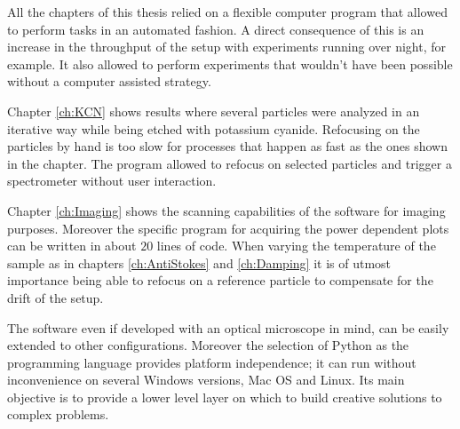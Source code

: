 All the chapters of this thesis relied on a flexible computer program that
allowed to perform tasks in an automated fashion. A direct consequence of this
is an increase in the throughput of the setup with experiments running over
night, for example. It also allowed to perform experiments that wouldn't have
been possible without a computer assisted strategy. 

Chapter \ref{ch:KCN} shows results where several particles were analyzed in an
iterative way while being etched with potassium cyanide. Refocusing on the
particles by hand is too slow for processes that happen as fast as the ones
shown in the chapter. The program allowed to refocus on selected particles and
trigger a spectrometer without user interaction. 

Chapter \ref{ch:Imaging} shows the scanning capabilities of the software for
imaging purposes. Moreover the specific program for acquiring the power
dependent plots can be written in about $20$ lines of code. When varying the
temperature of the sample as in chapters \ref{ch:AntiStokes} and
\ref{ch:Damping} it is of utmost importance being able to refocus on a reference
particle to compensate for the drift of the setup.  

The software even if developed with an optical microscope in mind, can be easily
extended to other configurations. Moreover the selection of Python as the
programming language provides platform independence; it can run without
inconvenience on several Windows versions, Mac OS and Linux. Its main objective
is to provide a lower level layer on which to build creative solutions to
complex problems.
